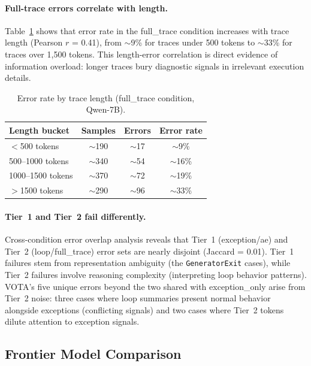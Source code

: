 \documentclass[11pt,a4paper]{article}
\begin{document}
\paragraph{Full-trace errors correlate with length.} Table~\ref{tab:length_errors} shows that error rate in the full\_trace condition increases with trace length (Pearson $r$ = 0.41), from $\sim$9\% for traces under 500 tokens to $\sim$33\% for traces over 1,500 tokens. This length-error correlation is direct evidence of information overload: longer traces bury diagnostic signals in irrelevant execution details.

\begin{table}[t]
\centering
\caption{Error rate by trace length (full\_trace condition, Qwen-7B).}
\label{tab:length_errors}
\small
\begin{tabular}{@{}lccc@{}}
\toprule
Length bucket & Samples & Errors & Error rate \\
\midrule
$<$500 tokens   & $\sim$190 & $\sim$17 & $\sim$9\% \\
500--1000 tokens & $\sim$340 & $\sim$54 & $\sim$16\% \\
1000--1500 tokens & $\sim$370 & $\sim$72 & $\sim$19\% \\
$>$1500 tokens  & $\sim$290 & $\sim$96 & $\sim$33\% \\
\bottomrule
\end{tabular}
\end{table}

\paragraph{Tier~1 and Tier~2 fail differently.} Cross-condition error overlap analysis reveals that Tier~1 (exception/ae) and Tier~2 (loop/full\_trace) error sets are nearly disjoint (Jaccard = 0.01). Tier~1 failures stem from representation ambiguity (the \texttt{GeneratorExit} cases), while Tier~2 failures involve reasoning complexity (interpreting loop behavior patterns). VOTA's five unique errors beyond the two shared with exception\_only arise from Tier~2 noise: three cases where loop summaries present normal behavior alongside exceptions (conflicting signals) and two cases where Tier~2 tokens dilute attention to exception signals.

\subsection{Frontier Model Comparison}
\label{sec:frontier}
\end{document}
